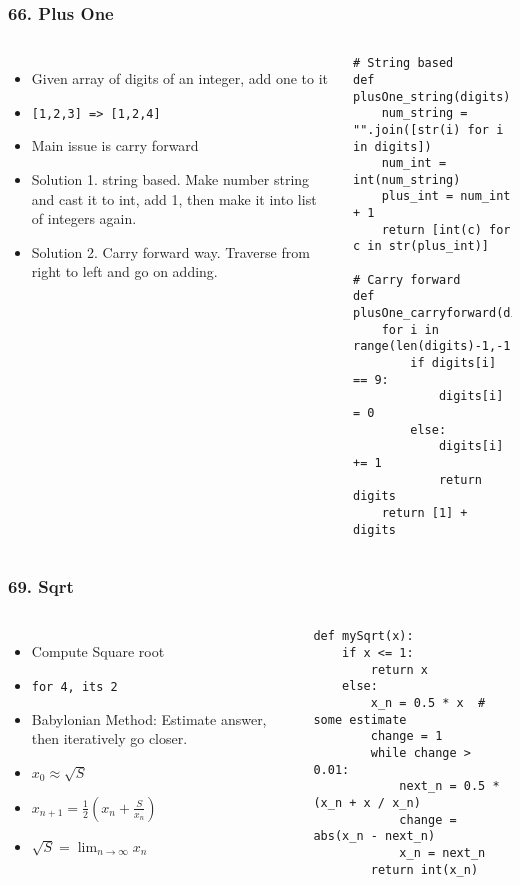 \begin{frame}[fragile]\frametitle{66. Plus One}

	\begin{columns}[T]
	\begin{itemize}
	\item Given array of digits of an integer, add one to it
	\item \lstinline{[1,2,3] => [1,2,4]}
	\item Main issue is carry forward
	\item Solution 1. string based. Make number string and cast it to int, add 1, then make it into list of integers again.
	\item Solution 2. Carry forward way. Traverse from right to left and go on adding.
	\end{itemize}
		\begin{lstlisting}[basicstyle=\scriptsize]
# String based
def plusOne_string(digits):
    num_string = "".join([str(i) for i in digits])
    num_int = int(num_string)
    plus_int = num_int + 1
    return [int(c) for c in str(plus_int)]
	
# Carry forward	
def plusOne_carryforward(digits):
    for i in range(len(digits)-1,-1,-1):
        if digits[i] == 9:
            digits[i] = 0
        else:
            digits[i] += 1
            return digits
    return [1] + digits		
				\end{lstlisting}		

	\end{columns}
		
\end{frame}

\begin{frame}[fragile]\frametitle{69. Sqrt}

	\begin{columns}[T]
	\begin{itemize}
	\item Compute Square root
	\item \lstinline{for 4, its 2}
	\item Babylonian Method: Estimate answer, then iteratively go closer.
	\item $x_0 \approx \sqrt{S}$
	\item $x_{n+1} = \frac{1}{2}(x_n + \frac{S}{x_n})$
	\item $\sqrt{S} = \lim_{n \rightarrow \infty} x_n$
	\end{itemize}
		\begin{lstlisting}[basicstyle=\scriptsize]
def mySqrt(x):
    if x <= 1:
        return x
    else:
        x_n = 0.5 * x  # some estimate
        change = 1
        while change > 0.01:
            next_n = 0.5 * (x_n + x / x_n)
            change = abs(x_n - next_n)
            x_n = next_n
        return int(x_n)

				\end{lstlisting}		

	\end{columns}
		
\end{frame}